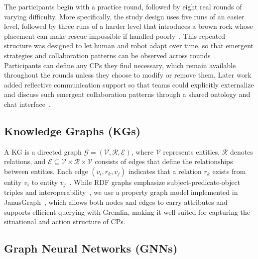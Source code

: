 \documentclass[letterpaper, 10 pt, conference]{ieeeconf}  %
\begin{document}
The participants begin with a practice round, followed by eight real rounds of varying
difficulty. More specifically, the study design uses five runs of an easier level,
followed by three runs of a harder level that introduces a brown rock whose placement can
make rescue impossible if handled poorly~\cite{vanZoelen2021}. This repeated structure
was designed to let human and robot adapt over time, so that emergent strategies and
collaboration patterns can be observed across rounds~\cite{vanZoelen2021,vanZoelen2025thesis}.
Participants can define any CPs they find necessary, which remain available throughout
the rounds unless they choose to modify or remove them. Later work added reflective
communication support so that teams could explicitly externalize and discuss such
emergent collaboration patterns through a shared ontology and chat interface~\cite{10.1145/3434074.3446354,vanZoelen2022}.

\subsection{Knowledge Graphs (KGs)}
\label{sec:kg}

A KG is a directed graph $\mathcal{G} = (\mathcal{V}, \mathcal{R}, \mathcal{E})$, where
$\mathcal{V}$ represents entities, $\mathcal{R}$ denotes relations, and $\mathcal{E}
\subseteq \mathcal{V} \times \mathcal{R} \times \mathcal{V}$ consists of edges that
define the relationships between entities. Each edge $(v_i, r_k, v_j)$ indicates that a
relation $r_k$ exists from entity $v_i$ to entity $v_j$~\cite{10.1145/3447772}. While
RDF graphs emphasize subject-predicate-object triples and
interoperability~\cite{Lanthaler:14:RCA}, we use a property graph model implemented in
JanusGraph~\cite{janusgraph_2024}, which allows both nodes and edges to carry attributes
and supports efficient querying with Gremlin, making it well-suited for capturing the
situational and action structure of CPs.

\subsection{Graph Neural Networks (GNNs)}
\label{sec:gnn}
\end{document}
